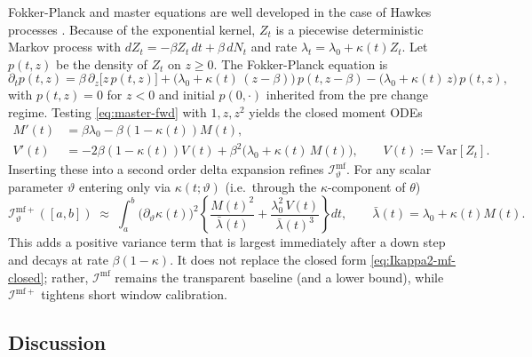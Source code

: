 \documentclass{article}
\theoremstyle{plain}
\theoremstyle{definition}
\newcommand{\Var}{\mathrm{Var}}
\newcommand{\1}{\mathbf{1}}
\begin{document}
    Fokker-Planck and master equations are well developed in the case of Hawkes processes \cite{hainaut2020fractional,kanazawa2020field}. Because of the exponential kernel, \(Z_t\) is a piecewise deterministic Markov process \cite{dion2020exponential} with
    \(dZ_t=-\beta Z_t\,dt+\beta\,dN_t\) and rate \(\lambda_t=\lambda_0+\kappa(t)Z_t\).
    Let \(p(t,z)\) be the density of \(Z_t\) on \(z\ge0\). The Fokker-Planck equation is
    \begin{equation}
    \label{eq:master-fwd}
    \partial_t p(t,z)
    = \beta\,\partial_z\!\big[z\,p(t,z)\big]
    +\big(\lambda_0+\kappa(t)\,(z-\beta)\big)\,p(t,z-\beta)
    -\big(\lambda_0+\kappa(t)\,z\big)\,p(t,z),
    \end{equation}
    with \(p(t,z)=0\) for \(z<0\) and initial \(p(0,\cdot)\) inherited from the pre change regime. Testing \eqref{eq:master-fwd} with \(1,z,z^2\) yields the closed moment ODEs
    \begin{align}
    \label{eq:moment-odes}
    M'(t)&=\beta\lambda_0-\beta(1-\kappa(t))M(t),\\
    V'(t)&=-2\beta(1-\kappa(t))V(t)+\beta^2\!\big(\lambda_0+\kappa(t)\,M(t)\big),\qquad V(t):=\Var[Z_t]. 
    \end{align}
    Inserting these into a second order delta expansion refines \(\mathcal I_\vartheta^{\mathrm{mf}}\). For any scalar parameter \(\vartheta\) entering only via \(\kappa(t;\vartheta)\) (i.e.\ through the \(\kappa\)-component of \(\theta\))
    \begin{equation}
    \label{eq:Ikappa-mf-plus}
    \mathcal I_\vartheta^{\mathrm{mf+}}([a,b])
    \;\approx\;\int_a^b \big(\partial_\vartheta\kappa(t)\big)^2
    \left\{\frac{M(t)^2}{\bar\lambda(t)}+\frac{\lambda_0^2\,V(t)}{\bar\lambda(t)^3}\right\}dt,
    \qquad \bar\lambda(t)=\lambda_0+\kappa(t)M(t).
    \end{equation}
    This adds a positive variance term that is largest immediately after a down step and decays at rate \(\beta(1-\kappa)\). It does not replace the closed form \eqref{eq:Ikappa2-mf-closed}; rather, \(\mathcal I^{\mathrm{mf}}\) remains the transparent baseline (and a lower bound), while \(\mathcal I^{\mathrm{mf+}}\) tightens short window calibration.
    
    \subsection{Discussion}
    
\end{document}
